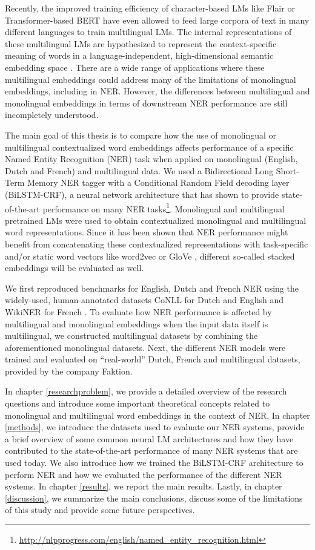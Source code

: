 \documentclass[12pt,a4paper,]{book}
\begin{document}
Recently, the improved training efficiency of character-based LMs like Flair \citep{akbik2018} or Transformer-based BERT \citep{devlin2019} have even allowed to feed large corpora of text in many different languages to train multilingual LMs. The internal representations of these multilingual LMs are hypothesized to represent the context-specific meaning of words in a language-independent, high-dimensional semantic embedding space \citep{pires2019}. There are a wide range of applications where these multilingual embeddings could address many of the limitations of monolingual embeddings, including in NER. However, the differences between multilingual and monolingual embeddings in terms of downstream NER performance are still incompletely understood.

The main goal of this thesis is to compare how the use of monolingual or multilingual contextualized word embeddings affects performance of a specific Named Entity Recognition (NER) task when applied on monolingual (English, Dutch and French) and multilingual data. We used a Bidirectional Long Short-Term Memory NER tagger with a Conditional Random Field decoding layer (BiLSTM-CRF), a neural network architecture that has shown to provide state-of-the-art performance on many NER tasks\footnote{\url{http://nlpprogress.com/english/named_entity_recognition.html}}. Monolingual and multilingual pretrained LMs were used to obtain contextualized monolingual and multilingual word representations. Since it has been shown that NER performance might benefit from concatenating these contextualized representations with task-specific \citep{lample2016} and/or static word vectors like word2vec \citep{mikolov2013} or GloVe \citep{pennington2014}, different so-called stacked embeddings will be evaluated as well.

We first reproduced benchmarks for English, Dutch and French NER using the widely-used, human-annotated datasets CoNLL for Dutch and English \citep{tjongkimsang2002, tjongkimsang2003} and WikiNER for French \citep{nothman2013}. To evaluate how NER performance is affected by multilingual and monolingual embeddings when the input data itself is multilingual, we constructed multilingual datasets by combining the aforementioned monolingual datasets. Next, the different NER models were trained and evaluated on ``real-world'' Dutch, French and multilingual datasets, provided by the company Faktion.

In chapter \ref{researchproblem}, we provide a detailed overview of the research questions and introduce some important theoretical concepts related to monolingual and multilingual word embeddings in the context of NER. In chapter \ref{methods}, we introduce the datasets used to evaluate our NER systems, provide a brief overview of some common neural LM architectures and how they have contributed to the state-of-the-art performance of many NER systems that are used today. We also introduce how we trained the BiLSTM-CRF architecture to perform NER and how we evaluated the performance of the different NER systems. In chapter \ref{results}, we report the main results. Lastly, in chapter \ref{discussion}, we summarize the main conclusions, discuss some of the limitations of this study and provide some future perspectives.
\end{document}
